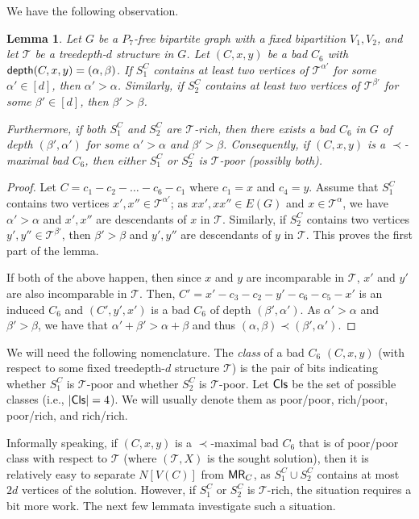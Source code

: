 \documentclass[11pt,a4paper]{article}
\newtheorem{lemma}[theorem]{Lemma}
\theoremstyle{definition}
\def\T{\mathcal{T}}
\begin{document}
We have the following observation.
\begin{lemma}\label{lem:bip-better-C6-in-rich-S}
Let $G$ be a $P_7$-free bipartite graph with a fixed bipartition $V_1,V_2$, and let $\T$ be a treedepth-$d$ structure in $G$.
Let $(C,x,y)$ be a bad $C_6$ with $\mathsf{depth}(C,x,y) = (\alpha,\beta)$. 
If $S_1^C$ contains at least two vertices of $\T^{\alpha'}$ for some $\alpha' \in [d]$, then $\alpha' > \alpha$.
Similarly, if $S_2^C$ contains at least two vertices of $\T^{\beta'}$ for some $\beta' \in [d]$, then $\beta' > \beta$.

Furthermore, if both $S_1^C$ and $S_2^C$ are $\T$-rich, then there exists a bad $C_6$ in $G$ of depth $(\beta',\alpha')$ for some
$\alpha' > \alpha$ and $\beta' > \beta$.
Consequently, if $(C,x,y)$ is a $\prec$-maximal bad $C_6$, then either $S_1^C$ or $S_2^C$ is $\T$-poor (possibly both).
\end{lemma}
\begin{proof}
    Let $C = c_1-c_2-\ldots-c_6-c_1$ where $c_1=x$ and $c_4=y$. 
    Assume that $S_1^C$ contains two vertices $x',x'' \in \T^{\alpha'}$; as $xx',xx'' \in E(G)$ and $x \in \T^\alpha$, we have $\alpha' > \alpha$ and $x',x''$ are descendants of $x$ in $\T$.
    Similarly, if $S_2^C$ contains two vertices $y',y'' \in \T^{\beta'}$, then $\beta' > \beta$ and $y',y''$ are descendants of $y$
    in $\T$. This proves the first part of the lemma.

    If both of the above happen, then since $x$ and $y$ are incomparable in $\T$, $x'$ and $y'$ are also incomparable in $\T$.
    Then, $C' = x'-c_3-c_2-y'-c_6-c_5-x'$ is an induced $C_6$ and $(C',y',x')$ is a bad $C_6$ of depth $(\beta',\alpha')$.
    As $\alpha' > \alpha$ and $\beta' > \beta$, we have that $\alpha' + \beta' > \alpha + \beta$ and thus $(\alpha,\beta) \prec (\beta',\alpha')$.
\end{proof}

We will need the following nomenclature. The \emph{class} of a bad $C_6$ $(C,x,y)$ (with respect to some fixed treedepth-$d$ structure $\T$) is the pair of bits indicating whether $S_1^C$ is $\T$-poor and whether $S_2^C$ is $\T$-poor.
Let $\mathsf{Cls}$ be the set of possible classes (i.e., $|\mathsf{Cls}| = 4$). 
We will usually denote them as poor/poor, rich/poor, poor/rich, and rich/rich. 

Informally speaking, if $(C,x,y)$ is a $\prec$-maximal bad $C_6$ that is of poor/poor class with respect to $\T$
(where $(\T,X)$ is the sought solution),
then it is relatively easy to separate $N[V(C)]$ from $\mathsf{MR}_C$, as $S_1^C \cup S_2^C$ contains at most $2d$ vertices of the solution. 
However, if $S_1^C$ or $S_2^C$ is $\T$-rich, the situation requires a bit more work.
The next few lemmata investigate such a situation.
\end{document}
